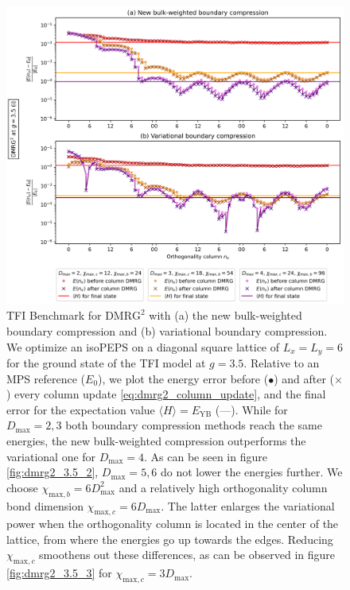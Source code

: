 \newpage
\vspace*{\fill}
\begin{figure}[H]
  \centering
  \includegraphics[width=1.0\linewidth]{dmrg_6_6_3.5_1.png}
  \caption{TFI Benchmark for $\text{DMRG}^2$ with (a) the new bulk-weighted boundary compression and (b) variational boundary compression. We optimize an isoPEPS on a diagonal square lattice of $L_x = L_y = 6$ for the ground state of the TFI model at $g = 3.5$. Relative to an MPS reference ($E_0$), we plot the energy error before ($\bullet$) and after ($\times$) every column update \eqref{eq:dmrg2_column_update}, and the final error for the expectation value $\langle H \rangle = E_{\text{YB}}$ (---). While for $D_{\text{max}} = 2, 3$ both boundary compression methods reach the same energies, the new bulk-weighted compression outperforms the variational one for $D_{\text{max}} = 4$. As can be seen in figure \ref{fig:dmrg2_3.5_2}, $D_{\text{max}} = 5, 6$ do not lower the energies further. We choose $\chi_{\text{max},b} = 6D_{\text{max}}^2$ and a relatively high orthogonality column bond dimension $\chi_{\text{max},c} = 6D_{\text{max}}$. The latter enlarges the variational power when the orthogonality column is located in the center of the lattice, from where the energies go up towards the edges. Reducing $\chi_{\text{max},c}$ smoothens out these differences, as can be observed in figure \ref{fig:dmrg2_3.5_3} for $\chi_{\text{max}, c} = 3D_{\text{max}}$.}
\label{fig:dmrg2_3.5_1}
\end{figure}
\vspace*{\fill}

